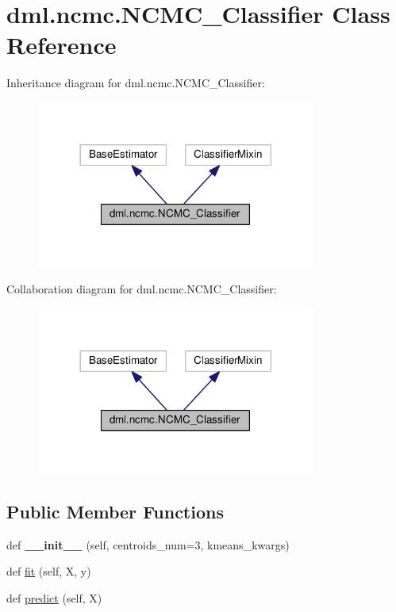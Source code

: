 \hypertarget{classdml_1_1ncmc_1_1NCMC__Classifier}{}\section{dml.\+ncmc.\+N\+C\+M\+C\+\_\+\+Classifier Class Reference}
\label{classdml_1_1ncmc_1_1NCMC__Classifier}


Inheritance diagram for dml.\+ncmc.\+N\+C\+M\+C\+\_\+\+Classifier\+:
\nopagebreak
\begin{figure}[H]
\begin{center}
\leavevmode
\includegraphics[width=260pt]{classdml_1_1ncmc_1_1NCMC__Classifier__inherit__graph}
\end{center}
\end{figure}


Collaboration diagram for dml.\+ncmc.\+N\+C\+M\+C\+\_\+\+Classifier\+:
\nopagebreak
\begin{figure}[H]
\begin{center}
\leavevmode
\includegraphics[width=260pt]{classdml_1_1ncmc_1_1NCMC__Classifier__coll__graph}
\end{center}
\end{figure}
\subsection*{Public Member Functions}
\begin{DoxyCompactItemize}
\item 
def {\bfseries \+\_\+\+\_\+init\+\_\+\+\_\+} (self, centroids\+\_\+num=3, kmeans\+\_\+kwargs)\hypertarget{classdml_1_1ncmc_1_1NCMC__Classifier_ab5bd6425900dacfc2899e6086653b64b}{}\label{classdml_1_1ncmc_1_1NCMC__Classifier_ab5bd6425900dacfc2899e6086653b64b}

\item 
def \hyperlink{classdml_1_1ncmc_1_1NCMC__Classifier_ad6afe7d5daca740d9d8542bafc6360c8}{fit} (self, X, y)
\item 
def \hyperlink{classdml_1_1ncmc_1_1NCMC__Classifier_af3a7507fd69eacaf0a53ce6fc0186e26}{predict} (self, X)
\end{DoxyCompactItemize}
